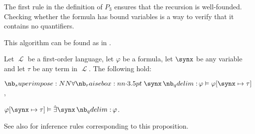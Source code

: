 \begin{comments}
  \item The first rule in the definition of \( P_3 \) ensures that the recursion is well-founded. Checking whether the formula has bound variables is a way to verify that it contains no quantifiers.
  \item This algorithm can be found as  in \cite{notebook:code}.
\end{comments}

\begin{proposition}\label{thm:quantifier_satisfiability}
  Let \( \mscrL \) be a first-order language, let \( \varphi \) be a formula, let \( \synx \) be any variable and let \( \tau \) be any term in \( \mscrL \). The following hold:

  \begin{thmenum}
     \( \qforall \synx \varphi \vDash \varphi[\synx \mapsto \tau] \),

     \( \varphi[\synx \mapsto \tau] \vDash \qexists \synx \varphi \).
  \end{thmenum}
\end{proposition}
\begin{comments}
  \item See also  for inference rules corresponding to this proposition.
\end{comments}
